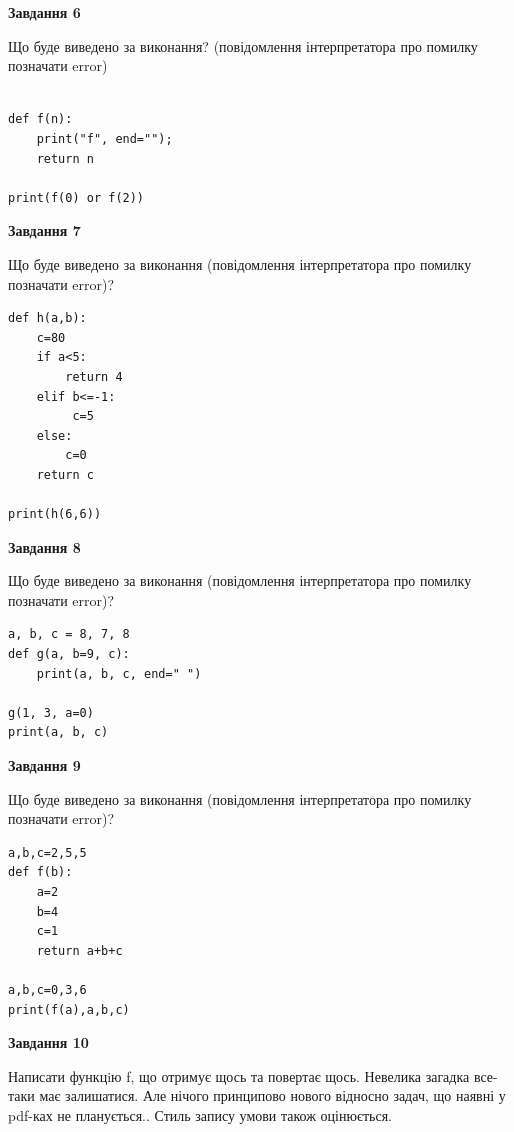 \documentclass[12pt, ukrainian]{article}
\begin{document}
{\begin {large}
{\begin {center}\textbf{Завдання 6}\end {center}}

Що буде виведено за виконання? (повідомлення інтерпретатора про помилку позначати error)\par
\begin{verbatim}

def f(n):
    print("f", end="");
    return n

print(f(0) or f(2))
\end{verbatim}

{\begin {center}\textbf{Завдання 7}\end {center}}

Що буде виведено за виконання (повідомлення інтерпретатора про помилку позначати error)?\par
\begin{verbatim}
def h(a,b):
    c=80
    if a<5:
        return 4
    elif b<=-1:
         c=5
    else: 
        c=0
    return c

print(h(6,6))
\end{verbatim}

{\begin {center}\textbf{Завдання 8}\end {center}}

Що буде виведено за виконання (повідомлення інтерпретатора про помилку позначати error)?\par
\begin{verbatim}
a, b, c = 8, 7, 8
def g(a, b=9, c):
    print(a, b, c, end=" ")

g(1, 3, a=0)
print(a, b, c)
\end{verbatim}

{\begin {center}\textbf{Завдання 9}\end {center}}

Що буде виведено за виконання (повідомлення інтерпретатора про помилку позначати error)?\par
\begin{verbatim}
a,b,c=2,5,5
def f(b):
    a=2
    b=4
    c=1
    return a+b+c

a,b,c=0,3,6
print(f(a),a,b,c)
\end{verbatim}

{\begin {center}\textbf{Завдання 10}\end {center}}


Написати функцiю f, що отримує щось та повертає щось. Невелика загадка все-таки має залишатися. Але нічого принципово нового відносно задач, що наявні у pdf-ках не планується.. Стиль запису умови також оцінюється.\par
\end {large}}
\newpage
\end{document}
